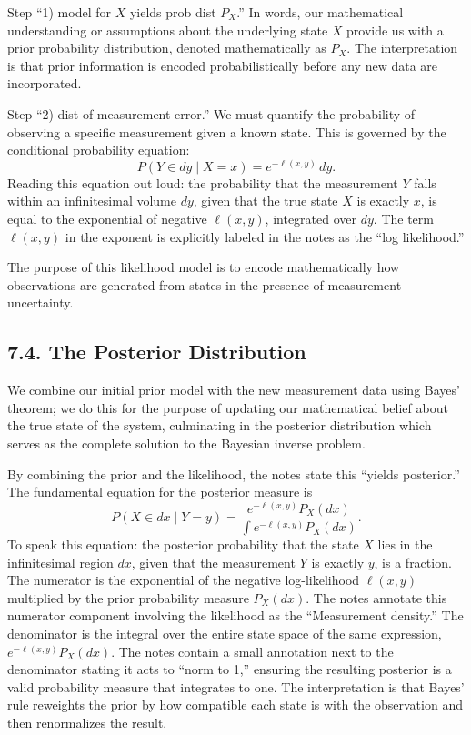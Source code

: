 \documentclass[11pt]{article}
\theoremstyle{definition}
\theoremstyle{remark}
\begin{document}
Step ``1) model for $X$ yields prob dist $P_X$.'' In words, our mathematical understanding or assumptions about the underlying state $X$ provide us with a prior probability distribution, denoted mathematically as $P_X$.
The interpretation is that prior information is encoded probabilistically before any new data are incorporated.

Step ``2) dist of measurement error.'' We must quantify the probability of observing a specific measurement given a known state. This is governed by the conditional probability equation:
\[
P(Y\in dy\mid X=x)=e^{-\ell(x,y)}\,dy.
\]
Reading this equation out loud: the probability that the measurement $Y$ falls within an infinitesimal volume $dy$, given that the true state $X$ is exactly $x$, is equal to the exponential of negative $\ell(x,y)$, integrated over $dy$. The term $\ell(x,y)$ in the exponent is explicitly labeled in the notes as the ``log likelihood.''

The purpose of this likelihood model is to encode mathematically how observations are generated from states in the presence of measurement uncertainty.

\subsection*{7.4. The Posterior Distribution}
We combine our initial prior model with the new measurement data using Bayes' theorem; we do this for the purpose of updating our mathematical belief about the true state of the system, culminating in the posterior distribution which serves as the complete solution to the Bayesian inverse problem.

By combining the prior and the likelihood, the notes state this ``yields posterior.'' The fundamental equation for the posterior measure is
\[
P(X\in dx\mid Y=y)=\frac{e^{-\ell(x,y)}P_X(dx)}{\int e^{-\ell(x,y)}P_X(dx)}.
\]
To speak this equation: the posterior probability that the state $X$ lies in the infinitesimal region $dx$, given that the measurement $Y$ is exactly $y$, is a fraction. The numerator is the exponential of the negative log-likelihood $\ell(x,y)$ multiplied by the prior probability measure $P_X(dx)$. The notes annotate this numerator component involving the likelihood as the ``Measurement density.'' The denominator is the integral over the entire state space of the same expression, $e^{-\ell(x,y)}P_X(dx)$. The notes contain a small annotation next to the denominator stating it acts to ``norm to 1,'' ensuring the resulting posterior is a valid probability measure that integrates to one.
The interpretation is that Bayes' rule reweights the prior by how compatible each state is with the observation and then renormalizes the result.
\end{document}
